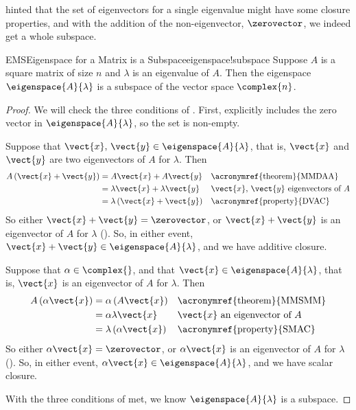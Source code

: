 %
 hinted that the set of eigenvectors for a single eigenvalue might have some closure properties, and with the addition of the non-eigenvector, $\zerovector$, we indeed get a whole subspace.
%
\begin{theorem}{EMS}{Eigenspace for a Matrix is a Subspace}{eigenspace!subspace}
Suppose  $A$ is a square matrix of size $n$ and $\lambda$ is an eigenvalue of $A$.  Then the eigenspace $\eigenspace{A}{\lambda}$ is a subspace of the vector space $\complex{n}$.
\end{theorem}
%
\begin{proof}
We will check the three conditions of .  First,  explicitly includes the zero vector in $\eigenspace{A}{\lambda}$, so the set is non-empty.\par
%
Suppose that $\vect{x},\,\vect{y}\in\eigenspace{A}{\lambda}$, that is, $\vect{x}$ and $\vect{y}$ are two eigenvectors of $A$ for $\lambda$.  Then
%
\begin{align*}
A\left(\vect{x}+\vect{y}\right)&=A\vect{x}+A\vect{y}&&\text{\acronymref{theorem}{MMDAA}}\\
&=\lambda\vect{x}+\lambda\vect{y}&&\text{$\vect{x},\,\vect{y}$ eigenvectors of $A$}\\
&=\lambda\left(\vect{x}+\vect{y}\right)&&\text{\acronymref{property}{DVAC}}
\end{align*}
%
So either $\vect{x}+\vect{y}=\zerovector$,  or $\vect{x}+\vect{y}$ is an eigenvector of $A$ for $\lambda$ (). So, in either event, $\vect{x}+\vect{y}\in\eigenspace{A}{\lambda}$, and we have additive closure.\par
%
Suppose that $\alpha\in\complex{\null}$, and that $\vect{x}\in\eigenspace{A}{\lambda}$, that is, $\vect{x}$ is an eigenvector of $A$ for $\lambda$.  Then
%
\begin{align*}
A\left(\alpha\vect{x}\right)&=\alpha\left(A\vect{x}\right)&&\text{\acronymref{theorem}{MMSMM}}\\
&=\alpha\lambda\vect{x}&&\text{$\vect{x}$ an eigenvector of $A$}\\
&=\lambda\left(\alpha\vect{x}\right)&&\text{\acronymref{property}{SMAC}}
\end{align*}
%
So either $\alpha\vect{x}=\zerovector$, or $\alpha\vect{x}$ is an eigenvector of $A$ for $\lambda$ ().  So, in either event,  $\alpha\vect{x}\in\eigenspace{A}{\lambda}$, and we have scalar closure.\par
%
With the three conditions of  met, we know $\eigenspace{A}{\lambda}$ is a subspace.
%
\end{proof}
